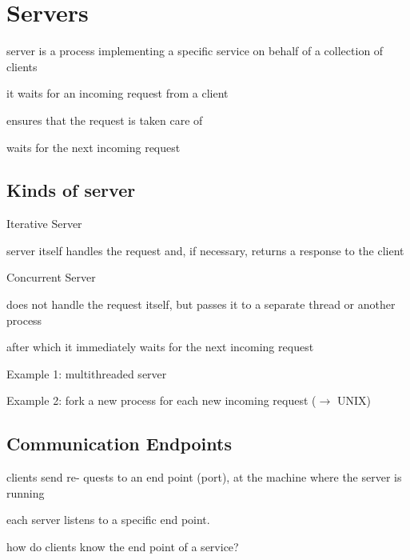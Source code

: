 \section{Servers}


\begin{compactitem}
	\item server is a process implementing a specific service on behalf of a collection of clients
	\item it waits for an incoming request from a client 
	\item ensures that the request is taken care of
	\item waits for the next incoming request
\end{compactitem}

\subsection{Kinds of server}

\begin{compactdesc}
	\item[Iterative Server] \ 
	\begin{compactitem}
		\item server itself handles the request and, if necessary, returns a response to the client
	\end{compactitem}
	\item[Concurrent Server] \  
	\begin{compactitem}
		\item does not handle the request itself, but passes it to a separate thread or another process
		\item after which it immediately waits for the next incoming request
		\item Example 1: multithreaded server 
		\item Example 2: fork a new process for each new incoming request ($\rightarrow$ UNIX)
	\end{compactitem}
\end{compactdesc}

\subsection{Communication Endpoints}

\begin{compactitem}
	\item clients send re- quests to an end point (port), at the machine where the server is running
	\item each server listens to a specific end point. 
	\item how do clients know the end point of a service?
\end{compactitem}

